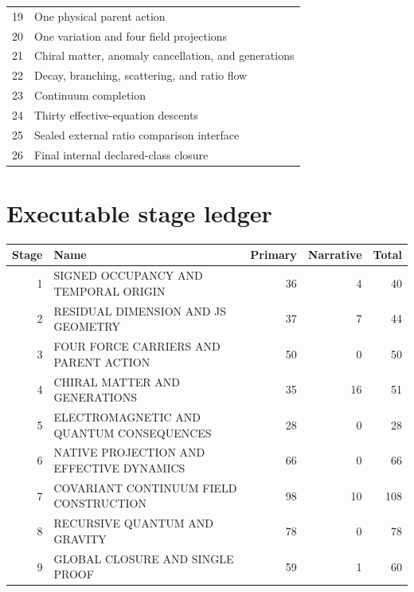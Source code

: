 \documentclass[11pt]{article}
\numberwithin{equation}{section}
\theoremstyle{remark}
\begin{document}
\begin{longtable}{r p{10.4cm}}
19&One physical parent action\\

20&One variation and four field projections\\

21&Chiral matter, anomaly cancellation, and generations\\

22&Decay, branching, scattering, and ratio flow\\

23&Continuum completion\\

24&Thirty effective-equation descents\\

25&Sealed external ratio comparison interface\\

26&Final internal declared-class closure\\

\bottomrule\end{longtable}

\section{Executable stage ledger}
\begin{longtable}{r p{7.4cm} r r r}
\toprule Stage&Name&Primary&Narrative&Total\\\midrule\endhead

1&SIGNED OCCUPANCY AND TEMPORAL ORIGIN&36&4&40\\

2&RESIDUAL DIMENSION AND JS GEOMETRY&37&7&44\\

3&FOUR FORCE CARRIERS AND PARENT ACTION&50&0&50\\

4&CHIRAL MATTER AND GENERATIONS&35&16&51\\

5&ELECTROMAGNETIC AND QUANTUM CONSEQUENCES&28&0&28\\

6&NATIVE PROJECTION AND EFFECTIVE DYNAMICS&66&0&66\\

7&COVARIANT CONTINUUM FIELD CONSTRUCTION&98&10&108\\

8&RECURSIVE QUANTUM AND GRAVITY&78&0&78\\

9&GLOBAL CLOSURE AND SINGLE PROOF&59&1&60\\

\bottomrule\end{longtable}
\end{document}
